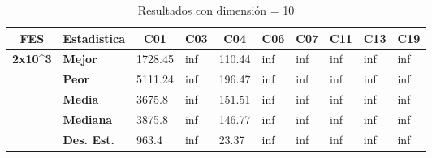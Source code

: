 \documentclass{article}
\begin{document}
\begin{table}[h!]
\centering
\caption{Resultados con dimensión = 10}
\label{dim10}
\begin{tabular}{|c|l|l|l|l|l|l|l|l|l|}
\hline
\textbf{FES}                                       & \multicolumn{1}{c|}{\textbf{Estadistica}} & \multicolumn{1}{c|}{\textbf{C01}} & \multicolumn{1}{c|}{\textbf{C03}} & \multicolumn{1}{c|}{\textbf{C04}} & \multicolumn{1}{c|}{\textbf{C06}} & \multicolumn{1}{c|}{\textbf{C07}} & \multicolumn{1}{c|}{\textbf{C11}} & \multicolumn{1}{c|}{\textbf{C13}} & \multicolumn{1}{c|}{\textbf{C19}} \\ \hline
\multirow{5}{*}{\textbf{2x10\textasciicircum{}3}}  & \textbf{Mejor}                            & 1728.45                           & inf                               & 110.44                            & inf                               & inf                               & inf                               & inf                               & inf                               \\ \cline{2-10} 
                                                   & \textbf{Peor}                             & 5111.24                           & inf                               & 196.47                            & inf                               & inf                               & inf                               & inf                               & inf                               \\ \cline{2-10} 
                                                   & \textbf{Media}                            & 3675.8                            & inf                               & 151.51                            & inf                               & inf                               & inf                               & inf                               & inf                               \\ \cline{2-10} 
                                                   & \textbf{Mediana}                          & 3875.8                            & inf                               & 146.77                            & inf                               & inf                               & inf                               & inf                               & inf                               \\ \cline{2-10} 
                                                   & \textbf{Des. Est.}                        & 963.4                             & inf                               & 23.37                             & inf                               & inf                               & inf                               & inf                               & inf                               \\ \hline

\end{tabular}
\end{table}
\end{document}

